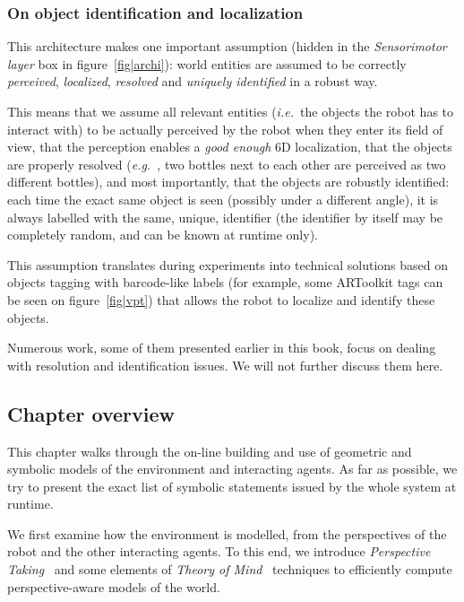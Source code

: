 \documentclass{svmult}
\newcommand{\ie}{{\textit{i.e.~}}}
\newcommand{\eg}{{\textit{e.g.~}}}
\begin{document}

\subsubsection*{On object identification and localization}

This architecture makes one important assumption (hidden in the
\emph{Sensorimotor layer} box in figure~\ref{fig|archi}): world entities are
assumed to be correctly \emph{perceived}, \emph{localized}, \emph{resolved} and
\emph{uniquely identified} in a robust way.

This means that we assume all relevant entities (\ie the objects the robot has
to interact with) to be actually perceived by the robot when they enter its
field of view, that the perception enables a \emph{good enough} 6D
localization, that the objects are properly resolved (\eg, two bottles next to
each other are perceived as two different bottles), and most importantly, that
the objects are robustly identified: each time the exact same object is seen
(possibly under a different angle), it is always labelled with the same,
unique, identifier (the identifier by itself may be completely random, and can
be known at runtime only).

This assumption translates during experiments into technical solutions based on
objects tagging with barcode-like labels (for example, some ARToolkit tags can
be seen on figure~\ref{fig|vpt}) that allows the robot to localize and identify
these objects.

Numerous work, some of them presented earlier in this book, focus on dealing
with resolution and identification issues.  We will not further discuss them
here.



\subsection{Chapter overview}

This chapter walks through the on-line building and use of geometric and
symbolic models of the environment and interacting agents. As far as possible,
we try to present the exact list of symbolic statements issued by the
whole system at runtime.

We first examine how the environment is modelled, from the perspectives of
the robot and the other interacting agents. To this end, we introduce
\emph{Perspective Taking}~\cite{Flavell1992,Tversky1999} and some elements of
\emph{Theory of Mind}~\cite{Scassellati2002} techniques to efficiently compute perspective-aware models of
the world. 
\end{document}
